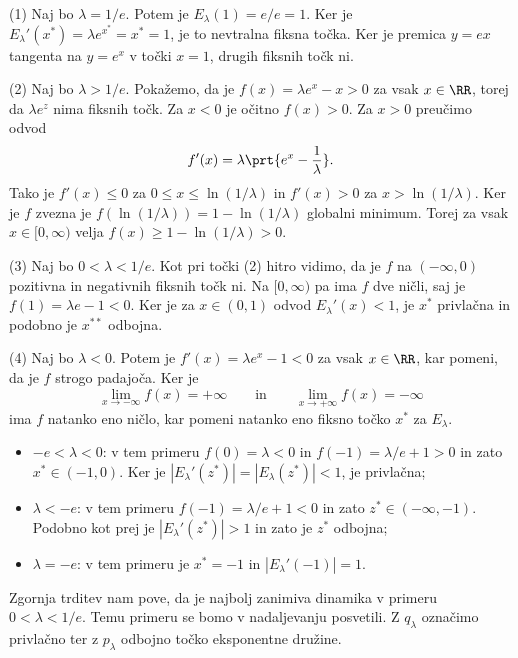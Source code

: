 \begin{dokaz}
    (1) Naj bo \(\lambda = 1/e\). Potem je \(E_\lambda (1) = e/e = 1\). Ker je \(E_\lambda' (x^*) = \lambda e^{x^*} = x^* = 1\), je to nevtralna fiksna točka. Ker je premica \(y = ex\) tangenta na \(y = e^x\) v točki \(x = 1\), drugih fiksnih točk ni.

    (2) Naj bo \(\lambda > 1/e\). Pokažemo, da je \(f (x) = \lambda e^x - x > 0\) za vsak \(x \in \RR\), torej da \(\lambda e^z\) nima fiksnih točk. Za \(x < 0\) je očitno \(f (x) > 0\). Za \(x > 0\) preučimo odvod
    \[f' (x) = \lambda \prt{e^x - \frac{1}{\lambda}}.\]
    Tako je \(f' (x) \leq 0\) za \(0 \leq x \leq \ln (1 / \lambda)\) in \(f' (x) > 0\) za \(x > \ln (1 / \lambda)\). Ker je \(f\) zvezna je \(f (\ln(1/\lambda)) = 1 - \ln (1 / \lambda)\) globalni minimum. Torej za vsak \(x \in [0, \infty)\) velja \(f (x) \geq 1 - \ln (1 / \lambda) > 0\).

    (3) Naj bo \(0 < \lambda < 1/e\). Kot pri točki (2) hitro vidimo, da je \(f\) na \((- \infty, 0)\) pozitivna in negativnih fiksnih točk ni. Na \([0, \infty)\) pa ima \(f\) dve ničli, saj je \(f (1) = \lambda e - 1 < 0\). Ker je za \(x \in (0, 1)\) odvod \(E_\lambda' (x) < 1\), je \(x^*\) privlačna in podobno je \(x^{**}\) odbojna.

    (4) Naj bo \(\lambda < 0\). Potem je \(f' (x) = \lambda e^x - 1 < 0\) za vsak \(x \in \RR\), kar pomeni, da je \(f\) strogo padajoča. Ker je
    \[\lim_{x \to - \infty} f (x) = + \infty \qquad \text{in} \qquad \lim_{x \to + \infty} f (x) = - \infty\]
    ima \(f\) natanko eno ničlo, kar pomeni natanko eno fiksno točko \(x^*\) za \(E_\lambda\).
    \begin{itemize}
        \item \(-e < \lambda < 0\): v tem primeru \(f (0) = \lambda < 0\) in \(f (-1) = \lambda / e + 1 > 0\) in zato \(x^* \in (-1, 0)\). Ker je \(|E_\lambda' (z^*)| = |E_\lambda (z^*)| < 1\), je privlačna;
        \item \(\lambda < -e\): v tem primeru \(f (-1) = \lambda / e + 1 < 0\) in zato \(z^* \in (- \infty, -1)\). Podobno kot prej je \(|E_\lambda' (z^*)| > 1\) in zato je \(z^*\) odbojna;
        \item \(\lambda = - e\): v tem primeru je \(x^* = -1\) in \(|E_\lambda' (-1)| = 1\).
    \end{itemize}
\end{dokaz}

\noindent Zgornja trditev nam pove, da je najbolj zanimiva dinamika v primeru \(0 < \lambda < 1/e\). Temu primeru se bomo v nadaljevanju posvetili. Z \(q_\lambda\) označimo privlačno ter z \(p_\lambda\) odbojno točko eksponentne družine.


